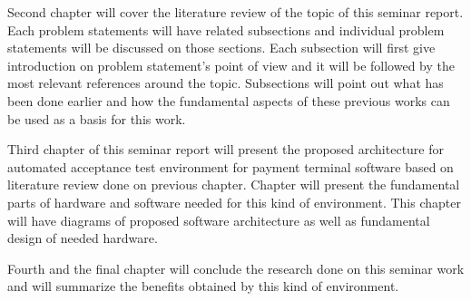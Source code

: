 Second chapter will cover the literature review of the topic of this seminar report. Each problem statements will have related subsections and individual problem statements will be discussed on those sections. Each subsection will first give introduction on problem statement's point of view and it will be followed by the most relevant references around the topic. Subsections will point out what has been done earlier and how the fundamental aspects of these previous works can be used as a basis for this work.

Third chapter of this seminar report will present the proposed architecture for automated acceptance test environment for payment terminal software based on literature review done on previous chapter. Chapter will present the fundamental parts of hardware and software needed for this kind of environment. This chapter will have diagrams of proposed software architecture as well as fundamental design of needed hardware.

Fourth and the final chapter will conclude the research done on this seminar work and will summarize the benefits obtained by this kind of environment.

